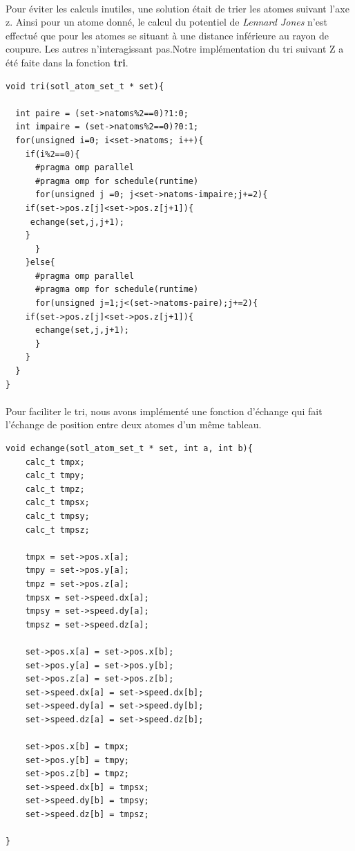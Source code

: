 \documentclass[a4paper,11pt]{report}
\begin{document}
\paragraph{}
Pour éviter les calculs inutiles, une solution était de trier les atomes suivant l'axe z. Ainsi pour un atome donné, le calcul du potentiel de \textit{Lennard Jones} n'est effectué que pour les atomes se situant à une distance inférieure au rayon de coupure. Les autres n'interagissant pas.Notre implémentation du tri  suivant Z a été faite dans la fonction \textbf{tri}.
\newline
\begin{lstlisting}[style=CStyle]
void tri(sotl_atom_set_t * set){

  int paire = (set->natoms%2==0)?1:0;
  int impaire = (set->natoms%2==0)?0:1;
  for(unsigned i=0; i<set->natoms; i++){
    if(i%2==0){
      #pragma omp parallel
      #pragma omp for schedule(runtime)
      for(unsigned j =0; j<set->natoms-impaire;j+=2){
	if(set->pos.z[j]<set->pos.z[j+1]){
	 echange(set,j,j+1);
	}
      }
    }else{
      #pragma omp parallel 
      #pragma omp for schedule(runtime)
      for(unsigned j=1;j<(set->natoms-paire);j+=2){
	if(set->pos.z[j]<set->pos.z[j+1]){
	  echange(set,j,j+1);
      }
    }
  }
}
\end{lstlisting}

\paragraph{}
Pour faciliter le tri, nous avons implémenté une fonction d'échange qui fait l'échange de position entre deux atomes d'un même  tableau.
\newline
\begin{lstlisting}[style=CStyle]
void echange(sotl_atom_set_t * set, int a, int b){
	calc_t tmpx;
	calc_t tmpy;	
	calc_t tmpz;
	calc_t tmpsx;
	calc_t tmpsy;
	calc_t tmpsz;

	tmpx = set->pos.x[a];
	tmpy = set->pos.y[a];
	tmpz = set->pos.z[a];
	tmpsx = set->speed.dx[a];
	tmpsy = set->speed.dy[a];
	tmpsz = set->speed.dz[a];

	set->pos.x[a] = set->pos.x[b];
	set->pos.y[a] = set->pos.y[b];
	set->pos.z[a] = set->pos.z[b];
	set->speed.dx[a] = set->speed.dx[b];
	set->speed.dy[a] = set->speed.dy[b];
	set->speed.dz[a] = set->speed.dz[b];

	set->pos.x[b] = tmpx;
	set->pos.y[b] = tmpy;
	set->pos.z[b] = tmpz;
	set->speed.dx[b] = tmpsx;
	set->speed.dy[b] = tmpsy;
	set->speed.dz[b] = tmpsz;

}
\end{lstlisting}
\end{document}

